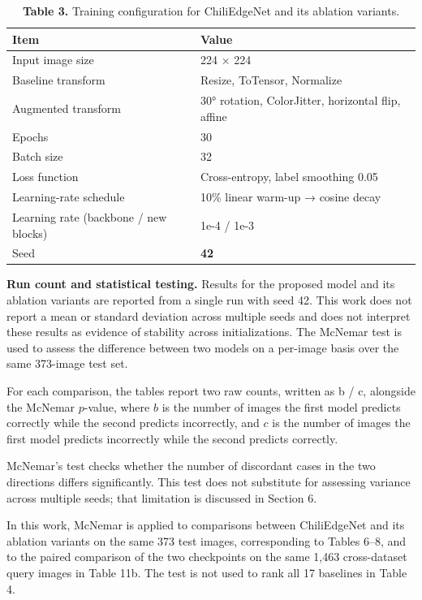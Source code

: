 \begin{table}[!tb]
\centering
\caption*{\textbf{Table 3.} Training configuration for ChiliEdgeNet and its ablation variants.}
\label{tab:3}
\small
\renewcommand{\arraystretch}{1.15}
\begin{tabular}{ll}
\toprule
\textbf{Item} & \textbf{Value} \\
\midrule
Input image size & 224 × 224 \\
Baseline transform & Resize, ToTensor, Normalize \\
Augmented transform & 30° rotation, ColorJitter, horizontal flip, affine \\
Epochs & 30 \\
Batch size & 32 \\
Loss function & Cross-entropy, label smoothing 0.05 \\
Learning-rate schedule & 10\% linear warm-up → cosine decay \\
Learning rate (backbone / new blocks) & 1e-4 / 1e-3 \\
Seed & \textbf{42} \\
\bottomrule
\end{tabular}
\end{table}

\textbf{Run count and statistical testing.} Results for the proposed model and its ablation variants are reported from a single run with seed 42. This work does not report a mean or standard deviation across multiple seeds and does not interpret these results as evidence of stability across initializations. The McNemar test is used to assess the difference between two models on a per-image basis over the same 373-image test set.

For each comparison, the tables report two raw counts, written as b / c, alongside the McNemar $p$-value, where $b$ is the number of images the first model predicts correctly while the second predicts incorrectly, and $c$ is the number of images the first model predicts incorrectly while the second predicts correctly.

McNemar's test checks whether the number of discordant cases in the two directions differs significantly. This test does not substitute for assessing variance across multiple seeds; that limitation is discussed in Section 6.

In this work, McNemar is applied to comparisons between ChiliEdgeNet and its ablation variants on the same 373 test images, corresponding to Tables 6--8, and to the paired comparison of the two checkpoints on the same 1,463 cross-dataset query images in Table 11b. The test is not used to rank all 17 baselines in Table 4.

